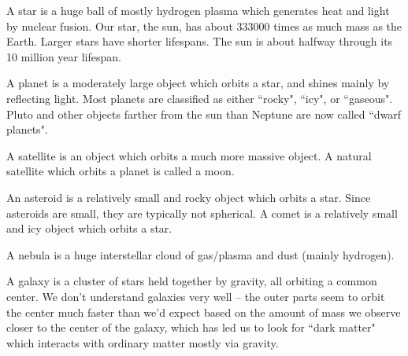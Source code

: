 \documentclass[class=article, crop=false]{standalone}
\begin{document}
\par
A star is a huge ball of mostly hydrogen plasma which generates heat and light by nuclear fusion. Our star, the sun, has about 333000 times as much mass as the Earth. Larger stars have shorter lifespans. The sun is about halfway through its 10 million year lifespan.
\par
A planet is a moderately large object which orbits a star, and shines mainly by reflecting light. Most planets are classified as either ``rocky", ``icy", or ``gaseous". Pluto and other objects farther from the sun than Neptune are now called ``dwarf planets".
\par
A satellite is an object which orbits a much more massive object. A natural satellite which orbits a planet is called a moon.
\par
An asteroid is a relatively small and rocky object which orbits a star. Since asteroids are small, they are typically not spherical. A comet is a relatively small and icy object which orbits a star.
\par
A nebula is a huge interstellar cloud of gas/plasma and dust (mainly hydrogen).
\par
A galaxy is a cluster of stars held together by gravity, all orbiting a common center. We don't understand galaxies very well -- the outer parts seem to orbit the center much faster than we'd expect based on the amount of mass we observe closer to the center of the galaxy, which has led us to look for ``dark matter" which interacts with ordinary matter mostly via gravity.
\end{document}
